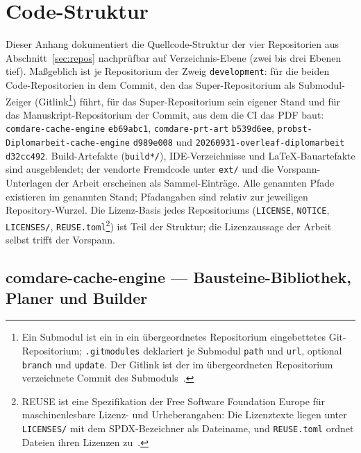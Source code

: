 \chapter{Code-Struktur}\label{app:code}

Dieser Anhang dokumentiert die Quellcode-Struktur der vier Repositorien aus Abschnitt~\ref{sec:repos}
nachprüfbar auf Verzeichnis-Ebene (zwei bis drei Ebenen tief). Maßgeblich ist je Repositorium der Zweig
\texttt{development}: für die beiden Code-Repositorien in dem Commit, den das Super-Repositorium als
Submodul-Zeiger (Gitlink\footnote{Ein Submodul ist ein in ein übergeordnetes Repositorium eingebettetes
Git-Repositorium; \texttt{.gitmodules} deklariert je Submodul \texttt{path} und \texttt{url}, optional
\texttt{branch} und \texttt{update}. Der Gitlink ist der im übergeordneten Repositorium verzeichnete
Commit des Submoduls~\cite{git2026gitmodules}.}) führt, für das Super-Repositorium sein eigener Stand und
für das Manuskript-Repositorium der Commit, aus dem die CI das PDF baut: \texttt{comdare-cache-engine}
\texttt{eb69abc1}, \texttt{comdare-prt-art} \texttt{b539d6ee},
\texttt{probst-\allowbreak{}Diplomarbeit-\allowbreak{}cache-\allowbreak{}engine} \texttt{d989e008} und
\texttt{20260931-\allowbreak{}overleaf-\allowbreak{}diplomarbeit} \texttt{d32cc492}. Build-Artefakte
(\texttt{build*/}), IDE-Verzeichnisse und LaTeX-Bauartefakte sind ausgeblendet; der vendorte Fremdcode
unter \texttt{ext/} und die Vorspann-Unterlagen der Arbeit erscheinen als Sammel-Einträge. Alle genannten
Pfade existieren im genannten Stand; Pfadangaben sind relativ zur jeweiligen Repository-Wurzel. Die
Lizenz-Basis jedes Repositoriums (\texttt{LICENSE}, \texttt{NOTICE}, \texttt{LICENSES/},
\texttt{REUSE.toml}\footnote{REUSE ist eine Spezifikation der Free Software Foundation Europe für
maschinenlesbare Lizenz- und Urheberangaben: Die Lizenztexte liegen unter \texttt{LICENSES/} mit dem
SPDX-Bezeichner als Dateiname, und \texttt{REUSE.toml} ordnet Dateien ihren Lizenzen
zu~\cite{fsfe2024reuse}.}) ist Teil der Struktur; die Lizenzaussage der Arbeit selbst trifft der Vorspann.

\section*{comdare-cache-engine --- Bausteine-Bibliothek, Planer und Builder}

